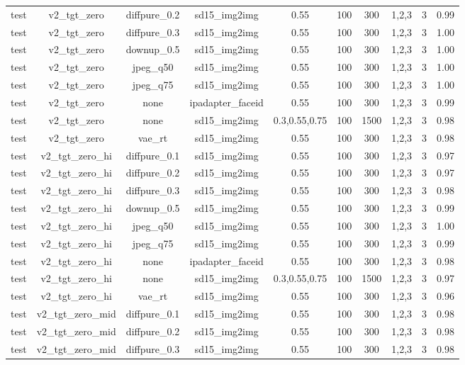 \begin{table}[t]
{\begin{tabular}{lccccccccc}
test & v2\_tgt\_zero & diffpure\_0.2 & sd15\_img2img & 0.55 & 100 & 300 & 1,2,3 & 3 & 0.99 \\
test & v2\_tgt\_zero & diffpure\_0.3 & sd15\_img2img & 0.55 & 100 & 300 & 1,2,3 & 3 & 1.00 \\
test & v2\_tgt\_zero & downup\_0.5 & sd15\_img2img & 0.55 & 100 & 300 & 1,2,3 & 3 & 1.00 \\
test & v2\_tgt\_zero & jpeg\_q50 & sd15\_img2img & 0.55 & 100 & 300 & 1,2,3 & 3 & 1.00 \\
test & v2\_tgt\_zero & jpeg\_q75 & sd15\_img2img & 0.55 & 100 & 300 & 1,2,3 & 3 & 1.00 \\
test & v2\_tgt\_zero & none & ipadapter\_faceid & 0.55 & 100 & 300 & 1,2,3 & 3 & 0.99 \\
test & v2\_tgt\_zero & none & sd15\_img2img & 0.3,0.55,0.75 & 100 & 1500 & 1,2,3 & 3 & 0.98 \\
test & v2\_tgt\_zero & vae\_rt & sd15\_img2img & 0.55 & 100 & 300 & 1,2,3 & 3 & 0.98 \\
test & v2\_tgt\_zero\_hi & diffpure\_0.1 & sd15\_img2img & 0.55 & 100 & 300 & 1,2,3 & 3 & 0.97 \\
test & v2\_tgt\_zero\_hi & diffpure\_0.2 & sd15\_img2img & 0.55 & 100 & 300 & 1,2,3 & 3 & 0.97 \\
test & v2\_tgt\_zero\_hi & diffpure\_0.3 & sd15\_img2img & 0.55 & 100 & 300 & 1,2,3 & 3 & 0.98 \\
test & v2\_tgt\_zero\_hi & downup\_0.5 & sd15\_img2img & 0.55 & 100 & 300 & 1,2,3 & 3 & 0.99 \\
test & v2\_tgt\_zero\_hi & jpeg\_q50 & sd15\_img2img & 0.55 & 100 & 300 & 1,2,3 & 3 & 1.00 \\
test & v2\_tgt\_zero\_hi & jpeg\_q75 & sd15\_img2img & 0.55 & 100 & 300 & 1,2,3 & 3 & 0.99 \\
test & v2\_tgt\_zero\_hi & none & ipadapter\_faceid & 0.55 & 100 & 300 & 1,2,3 & 3 & 0.98 \\
test & v2\_tgt\_zero\_hi & none & sd15\_img2img & 0.3,0.55,0.75 & 100 & 1500 & 1,2,3 & 3 & 0.97 \\
test & v2\_tgt\_zero\_hi & vae\_rt & sd15\_img2img & 0.55 & 100 & 300 & 1,2,3 & 3 & 0.96 \\
test & v2\_tgt\_zero\_mid & diffpure\_0.1 & sd15\_img2img & 0.55 & 100 & 300 & 1,2,3 & 3 & 0.98 \\
test & v2\_tgt\_zero\_mid & diffpure\_0.2 & sd15\_img2img & 0.55 & 100 & 300 & 1,2,3 & 3 & 0.98 \\
test & v2\_tgt\_zero\_mid & diffpure\_0.3 & sd15\_img2img & 0.55 & 100 & 300 & 1,2,3 & 3 & 0.98 \\

\end{tabular}}
\end{table}
